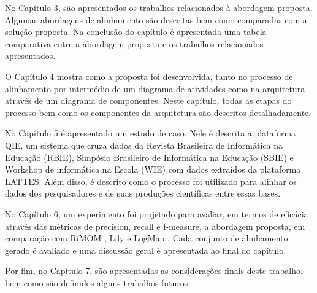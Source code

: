 No Capítulo 3, são apresentados os trabalhos relacionados à abordagem proposta. Algumas abordagens de alinhamento são descritas bem como comparadas com a solução proposta. Na conclusão do capítulo é apresentada uma tabela comparativa entre a abordagem proposta e os trabalhos relacionados apresentados.

O Capítulo 4 mostra como a proposta foi desenvolvida, tanto no processo de alinhamento por intermédio de um diagrama de atividades como na arquitetura através de um diagrama de componentes. Neste capítulo, todas as etapas do processo bem como os componentes da arquitetura são descritos detalhadamente.

No Capítulo 5 é apresentado um estudo de caso. Nele é descrita a plataforma QIE, um sistema que cruza dados da Revista Brasileira de Informática na Educação (RBIE), Simpósio Brasileiro de Informática na Educação (SBIE) e Workshop de informática na Escola (WIE) com dados extraídos da plataforma LATTES. Além disso, é descrito como o processo foi utilizado para alinhar os dados dos pesquisadores e de suas produções científicas entre essas bases.

No Capítulo 6, um experimento foi projetado para avaliar, em termos de eficácia através das métricas de precision, recall e f-measure, a abordagem proposta, em comparação com RiMOM \cite{zhang2015rimom} , Lily \cite{wang2015lily} e LogMap \cite{jimenez2015logmap}. Cada conjunto de alinhamento gerado é avaliado e uma discussão geral é apresentada ao final do capítulo.

Por fim, no Capítulo 7, são apresentadas as considerações finais deste trabalho. bem como são definidos alguns trabalhos futuros.
